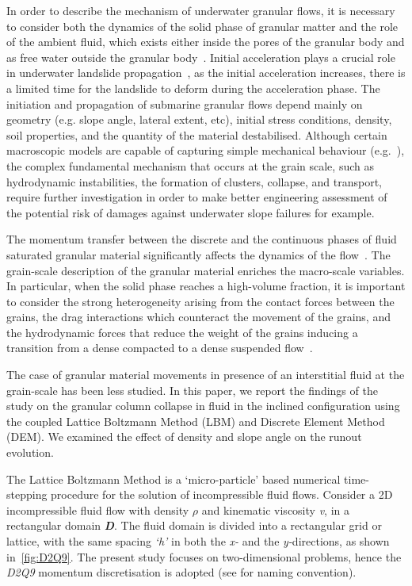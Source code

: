 \documentclass[12pt,twoside]{tuhhproc-en}
\begin{document}
In order to describe the mechanism of underwater granular flows, it is necessary to consider both the dynamics of the solid phase of granular matter and the role of the ambient fluid, which exists either inside the pores of the granular body and as free water outside the granular body~\citep{Denlinger2001,Iverson1997}. Initial acceleration plays a crucial role in underwater landslide propagation~\citep{Romano2017}, as the initial acceleration increases, there is a limited time for the landslide to deform during the acceleration phase. The initiation and propagation of submarine granular flows depend mainly on geometry (e.g. slope angle, lateral extent, etc), initial stress conditions, density, soil properties, and the quantity of the material destabilised. Although certain macroscopic models are capable of capturing simple mechanical behaviour (e.g.~\citet{Topin2011}), the complex fundamental mechanism that occurs at the grain scale, such as hydrodynamic instabilities, the formation of clusters, collapse, and transport, require further investigation in order to make better engineering assessment of the potential risk of damages against underwater slope failures for example. 

The momentum transfer between the discrete and the continuous phases of fluid saturated granular material significantly affects the dynamics of the flow~\citep{Peker2007}.
The grain-scale description of the granular material enriches the macro-scale variables. In particular, when the solid phase reaches a high-volume fraction, it is important to consider the strong heterogeneity arising from the contact forces between the grains, the drag interactions which counteract the movement of the grains, and the hydrodynamic forces that reduce the weight of the grains inducing a transition from a dense compacted to a dense suspended flow~\citep{Meruane2010}. 

The case of granular material movements in presence of an interstitial fluid at the grain-scale has been less studied. In this paper, we report the findings of the study on the granular column collapse in fluid in the inclined configuration using the coupled Lattice Boltzmann Method (LBM) and Discrete Element Method (DEM). We examined the effect of density and slope angle on the runout evolution.


The Lattice Boltzmann Method is a `micro-particle' based numerical time-stepping procedure for the solution of incompressible fluid flows. Consider a 2D incompressible fluid flow with density $\rho$ and kinematic viscosity \textit{v}, in a rectangular domain \textit{\textbf{D}}. The fluid domain is divided into a rectangular grid or lattice, with the same spacing \textit{`h'} in both the \textit{x-} and the \textit{y-}directions, as shown in~\cref{fig:D2Q9}. The present study focuses on two-dimensional problems, hence the \textit{D2Q9} momentum discretisation is adopted (see \citep{He1997} for naming convention).
\end{document}
